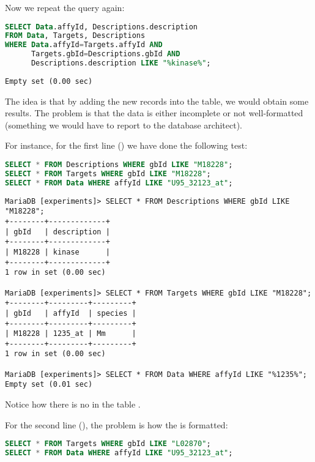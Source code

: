 Now we repeat the query again:
\begin{lstlisting}[language=sql]
SELECT Data.affyId, Descriptions.description
FROM Data, Targets, Descriptions
WHERE Data.affyId=Targets.affyId AND
      Targets.gbId=Descriptions.gbId AND
      Descriptions.description LIKE "%kinase%";
\end{lstlisting}

\begin{lstlisting}[style=output]
Empty set (0.00 sec)
\end{lstlisting}

The idea is that by adding the new records into the  table, we would obtain some results. The problem is that the data is either incomplete or not well-formatted (something we would have to report to the database architect).

For instance, for the first line () we have done the following test:
\begin{lstlisting}[language=sql]
SELECT * FROM Descriptions WHERE gbId LIKE "M18228";
SELECT * FROM Targets WHERE gbId LIKE "M18228";
SELECT * FROM Data WHERE affyId LIKE "U95_32123_at";
\end{lstlisting}

\begin{lstlisting}[style=output]
MariaDB [experiments]> SELECT * FROM Descriptions WHERE gbId LIKE "M18228";
+--------+-------------+
| gbId   | description |
+--------+-------------+
| M18228 | kinase      |
+--------+-------------+
1 row in set (0.00 sec)

MariaDB [experiments]> SELECT * FROM Targets WHERE gbId LIKE "M18228";
+--------+---------+---------+
| gbId   | affyId  | species |
+--------+---------+---------+
| M18228 | 1235_at | Mm      |
+--------+---------+---------+
1 row in set (0.00 sec)

MariaDB [experiments]> SELECT * FROM Data WHERE affyId LIKE "%1235%";
Empty set (0.01 sec)
\end{lstlisting}
Notice how there is no   in the table .

For the second line (), the problem is how the  is formatted:

\begin{lstlisting}[language=sql]
SELECT * FROM Targets WHERE gbId LIKE "L02870";
SELECT * FROM Data WHERE affyId LIKE "U95_32123_at";
\end{lstlisting}


